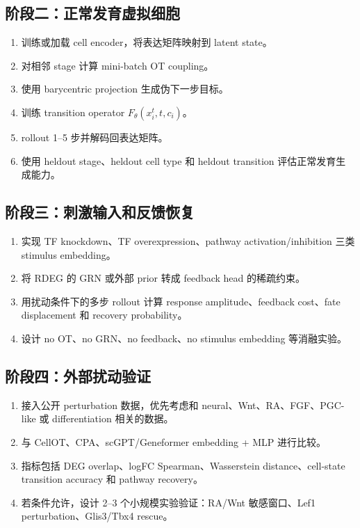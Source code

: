 \documentclass[UTF8,12pt]{ctexart}
\newcommand{\RDEG}{\textsc{RDEG}}
\newcommand{\OT}{\textsc{OT}}
\begin{document}
\subsection{阶段二：正常发育虚拟细胞}

\begin{enumerate}[label=\arabic*.]
    \item 训练或加载 cell encoder，将表达矩阵映射到 latent state。
    \item 对相邻 stage 计算 mini-batch \OT{} coupling。
    \item 使用 barycentric projection 生成伪下一步目标。
    \item 训练 transition operator $F_\theta(x_i^t,t,c_i)$。
    \item rollout 1--5 步并解码回表达矩阵。
    \item 使用 heldout stage、heldout cell type 和 heldout transition 评估正常发育生成能力。
\end{enumerate}

\subsection{阶段三：刺激输入和反馈恢复}

\begin{enumerate}[label=\arabic*.]
    \item 实现 TF knockdown、TF overexpression、pathway activation/inhibition 三类 stimulus embedding。
    \item 将 \RDEG{} 的 GRN 或外部 prior 转成 feedback head 的稀疏约束。
    \item 用扰动条件下的多步 rollout 计算 response amplitude、feedback cost、fate displacement 和 recovery probability。
    \item 设计 no OT、no GRN、no feedback、no stimulus embedding 等消融实验。
\end{enumerate}

\subsection{阶段四：外部扰动验证}

\begin{enumerate}[label=\arabic*.]
    \item 接入公开 perturbation 数据，优先考虑和 neural、Wnt、RA、FGF、PGC-like 或 differentiation 相关的数据。
    \item 与 CellOT、CPA、scGPT/Geneformer embedding + MLP 进行比较。
    \item 指标包括 DEG overlap、logFC Spearman、Wasserstein distance、cell-state transition accuracy 和 pathway recovery。
    \item 若条件允许，设计 2--3 个小规模实验验证：RA/Wnt 敏感窗口、Lef1 perturbation、Glis3/Tbx4 rescue。
\end{enumerate}
\end{document}

